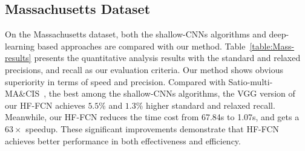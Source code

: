 \subsection{Massachusetts Dataset}
On the Massachusetts dataset, both the shallow-CNNs algorithms and deep-learning based approaches are compared with our method.
Table~\ref{table:Mass-results} presents the quantitative analysis results with the standard and relaxed precisions, and recall as our evaluation criteria.
Our method shows obvious superiority in terms of speed and precision.
%
Compared with Satio-multi-MA\&CIS~\cite{IEEEexample:saito2016multiple}, the best among the shallow-CNNs algorithms, the VGG version of our HF-FCN achieves $5.5\%$ and $1.3\%$ higher standard and relaxed recall.
%
Meanwhile, our HF-FCN reduces the time cost from 67.84s to 1.07s, and gets a $63\times$ speedup.
These significant improvements demonstrate that HF-FCN achieves better performance in both effectiveness and efficiency.

